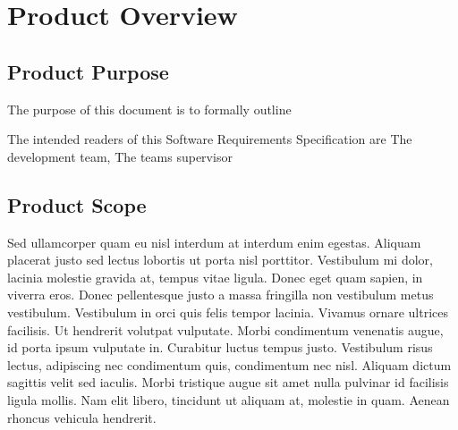 
\chapter{Product Overview} %

\label{Part6Chapter2} %



\section{Product Purpose}

The purpose of this document is to formally outline 

The intended readers of this Software Requirements Specification are The development team, The teams supervisor 


\section{Product Scope}

Sed ullamcorper quam eu nisl interdum at interdum enim egestas. Aliquam placerat justo sed lectus lobortis ut porta nisl porttitor. Vestibulum mi dolor, lacinia molestie gravida at, tempus vitae ligula. Donec eget quam sapien, in viverra eros. Donec pellentesque justo a massa fringilla non vestibulum metus vestibulum. Vestibulum in orci quis felis tempor lacinia. Vivamus ornare ultrices facilisis. Ut hendrerit volutpat vulputate. Morbi condimentum venenatis augue, id porta ipsum vulputate in. Curabitur luctus tempus justo. Vestibulum risus lectus, adipiscing nec condimentum quis, condimentum nec nisl. Aliquam dictum sagittis velit sed iaculis. Morbi tristique augue sit amet nulla pulvinar id facilisis ligula mollis. Nam elit libero, tincidunt ut aliquam at, molestie in quam. Aenean rhoncus vehicula hendrerit.

